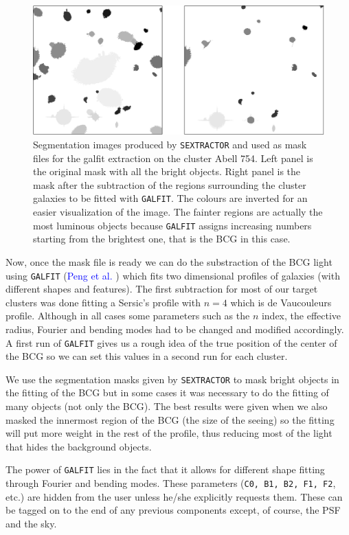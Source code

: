 \begin{figure}[H]
\centering
\includegraphics[width=15cm]{images/masks.png}
\caption[Segmentation images]{Segmentation images produced by \texttt{SEXTRACTOR} and used as mask files for the galfit extraction on the cluster Abell 754. Left panel is the original mask with all the bright objects. Right panel is the mask after the subtraction of the regions surrounding the cluster galaxies to be fitted with \texttt{GALFIT}. The colours are inverted for an easier visualization of the image. The fainter regions are actually the most luminous objects because \texttt{GALFIT} assigns increasing numbers starting from the brightest one, that is the BCG in this case.}
\end{figure}

Now, once the mask file is ready we can do the substraction of the BCG light using \texttt{GALFIT} (\textcolor{blue}{Peng et al.} \citeyear{Reference20}) which fits two dimensional profiles of galaxies (with different shapes and features). The first subtraction for most of our target clusters was done fitting a Sersic's profile with $n=4$ which is de Vaucouleurs profile. Although in all cases some parameters such as the $n$ index, the effective radius, Fourier and bending modes had to be changed and modified accordingly. A first run of \texttt{GALFIT} gives us a rough idea of the true position of the center of the BCG so we can set this values in a second run for each cluster. 

We use the segmentation masks given by \texttt{SEXTRACTOR} to mask bright objects in the fitting of the BCG but in some cases it was necessary to do the fitting of many objects (not only the BCG). The best results were given when we also masked the innermost region of the BCG (the size of the seeing) so the fitting will put more weight in the rest of the profile, thus reducing most of the light that hides the background objects.

The power of \texttt{GALFIT} lies in the fact that it allows for different shape fitting through Fourier and bending modes. These parameters (\texttt{C0, B1, B2, F1, F2}, etc.) are hidden from the user unless he/she explicitly requests them.  These can be tagged on to the end of any previous components except, of course, the PSF and the sky.  

